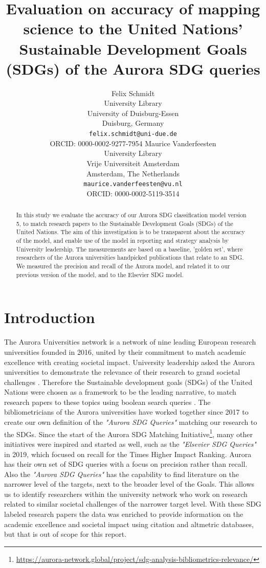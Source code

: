 \documentclass{article}
\title{Evaluation on accuracy of mapping science to the United Nations' Sustainable Development Goals (SDGs) of the Aurora SDG queries}
\author{
  Felix Schmidt \\
  University Library\\
  University of Duisburg-Essen\\
  Duisburg, Germany\\
  \texttt{felix.schmidt@uni-due.de} \\
  ORCID: 0000-0002-9277-7954
   \And
Maurice Vanderfeesten \\
  University Library\\
  Vrije Universiteit Amsterdam\\
  Amsterdam, The Netherlands \\
  \texttt{maurice.vanderfeesten@vu.nl} \\
  ORCID: 0000-0002-5119-3514\\
}
\begin{document}
\maketitle

\begin{abstract}
In this study we evaluate the accuracy of our Aurora SDG classification model version 5, to match research papers to the Sustainable Development Goals (SDGs) of the United Nations. The aim of this investigation is to be transparent about the accuracy of the model, and enable use of the model in reporting and strategy analysis by University leadership. The measurements are based on a baseline, 'golden set', where researchers of the Aurora universities handpicked publications that relate to an SDG. We measured the precision and recall of the Aurora model, and related it to our previous version of the model, and to the Elsevier SDG model. 
\end{abstract}




\section{Introduction}
The Aurora Universities network is a network of nine leading European research universities founded in 2016, united by their commitment to match academic excellence with creating societal impact. University leadership asked the Aurora universities to demonstrate the relevance of their research to grand societal challenges \cite{vanderfeesten_societal_2017, drooge_evaluating_2010, carley_social_2019}. Therefore the Sustainable development goals (SDGs) of the United Nations were chosen as a framework to be the leading narrative, to match research papers to these topics using boolean search queries \cite{armitage_mapping_2020}. The bibliometricians of the Aurora universities have worked together since 2017 to create our own definition of the \emph{"Aurora SDG Queries"} matching our research to the SDGs. Since the start of the Aurora SDG Matching Initiative\footnote{\url{https://aurora-network.global/project/sdg-analysis-bibliometrics-relevance/}}, many other initiatives were inspired and started as well, such as the \emph{"Elsevier SDG Queries"} \cite{jayabalasingham_identifying_2019}  in 2019, which focused on recall for the Times Higher Impact Ranking. Aurora has their own set of SDG queries with a focus on precision rather than recall. Also the \emph{"Aurora SDG Queries"} has the capability to find literature on the narrower level of the targets, next to the broader level of the Goals. This allows us to identify researchers within the university network who work on research related to similar societal challenges of the narrower target level.  With these SDG labeled research papers the data was enriched to provide information on the academic excellence and societal impact \cite{bornmann_what_2013} using citation and altmetric databases, but that is out of scope for this report. 
\end{document}
